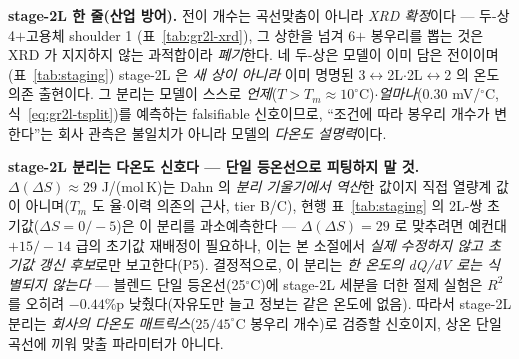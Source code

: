 \begin{keybox}
\textbf{stage-2L 한 줄(산업 방어).} 전이 개수는 곡선맞춤이 아니라 \emph{XRD 확정}이다 --- 두-상 4$+$고용체 shoulder 1
(표~\ref{tab:gr2l-xrd}), 그 상한을 넘겨 6$+$ 봉우리를 뽑는 것은 XRD 가 지지하지 않는 과적합이라 \emph{폐기}한다. 네 두-상은
모델이 이미 담은 전이이며(표~\ref{tab:staging}) stage-2L 은 \emph{새 상이 아니라} 이미 명명된 3$\leftrightarrow$2L$\cdot$2L$\leftrightarrow$2
의 온도 의존 출현이다. 그 분리는 모델이 스스로 \emph{언제}($T\!>\!T_m\!\approx\!10^\circ$C)$\cdot$\emph{얼마나}($0.30$ mV/$^\circ$C,
식~\eqref{eq:gr2l-tsplit})를 예측하는 falsifiable 신호이므로, ``조건에 따라 봉우리 개수가 변한다''는 회사 관측은
불일치가 아니라 모델의 \emph{다온도 설명력}이다.
\end{keybox}

\begin{warnbox}
\textbf{stage-2L 분리는 다온도 신호다 --- 단일 등온선으로 피팅하지 말 것.} $\Delta(\Delta S)\approx29$ J/(mol\,K)는
Dahn 의 \emph{분리 기울기에서 역산}한 값이지 직접 열량계 값이 아니며($T_m$ 도 율$\cdot$이력 의존의 근사, tier B/C),
현행 표~\ref{tab:staging} 의 2L-쌍 초기값($\Delta S{=}0/{-}5$)은 이 분리를 과소예측한다 --- $\Delta(\Delta S)=29$ 로
맞추려면 예컨대 $+15/{-}14$ 급의 초기값 재배정이 필요하나, 이는 본 소절에서 \emph{실제 수정하지 않고 초기값 갱신
후보}로만 보고한다(P5). 결정적으로, 이 분리는 \emph{한 온도의 dQ/dV 로는 식별되지 않는다} --- 블렌드 단일
등온선(25$^\circ$C)에 stage-2L 세분을 더한 절제 실험은 $R^2$ 를 오히려 $-0.44$\%p 낮췄다(자유도만 늘고 정보는
같은 온도에 없음). 따라서 stage-2L 분리는 \emph{회사의 다온도 매트릭스}($25/45^\circ$C 봉우리 개수)로 검증할
신호이지, 상온 단일 곡선에 끼워 맞출 파라미터가 아니다.
\end{warnbox}

